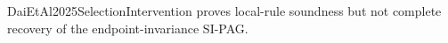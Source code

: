 DaiEtAl2025SelectionIntervention proves local-rule soundness but not complete recovery of the endpoint-invariance SI-PAG.